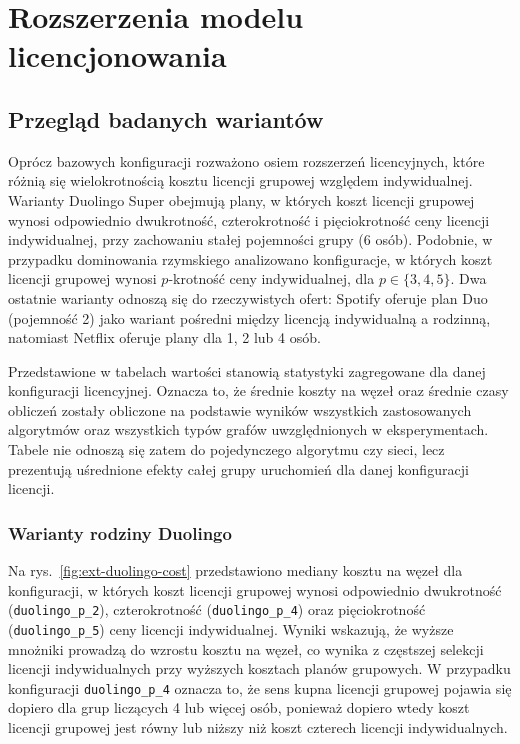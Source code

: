 \chapter{Rozszerzenia modelu licencjonowania}\label{chap:extensions}

\section{Przegląd badanych wariantów}
Oprócz bazowych konfiguracji rozważono osiem rozszerzeń licencyjnych, które różnią się wielokrotnością kosztu licencji grupowej względem indywidualnej. Warianty Duolingo Super obejmują plany, w których koszt licencji grupowej wynosi odpowiednio dwukrotność, czterokrotność i pięciokrotność ceny licencji indywidualnej, przy zachowaniu stałej pojemności grupy (6 osób). Podobnie, w przypadku dominowania rzymskiego analizowano konfiguracje, w których koszt licencji grupowej wynosi $p$-krotność ceny indywidualnej, dla $p \in \{3, 4, 5\}$. Dwa ostatnie warianty odnoszą się do rzeczywistych ofert: Spotify oferuje plan Duo (pojemność 2) jako wariant pośredni między licencją indywidualną a rodzinną, natomiast Netflix oferuje plany dla 1, 2 lub 4 osób.

Przedstawione w tabelach wartości stanowią statystyki zagregowane dla danej konfiguracji licencyjnej. Oznacza to, że średnie koszty na węzeł oraz średnie czasy obliczeń zostały obliczone na podstawie wyników wszystkich zastosowanych algorytmów oraz wszystkich typów grafów uwzględnionych w eksperymentach. Tabele nie odnoszą się zatem do pojedynczego algorytmu czy sieci, lecz prezentują uśrednione efekty całej grupy uruchomień dla danej konfiguracji licencji.


\subsection{Warianty rodziny Duolingo}
Na rys.~\ref{fig:ext-duolingo-cost} przedstawiono mediany kosztu na węzeł dla konfiguracji, w których koszt licencji grupowej wynosi odpowiednio dwukrotność (\texttt{duolingo\_p\_2}), czterokrotność (\texttt{duolingo\_p\_4}) oraz pięciokrotność (\texttt{duolingo\_p\_5}) ceny licencji indywidualnej. Wyniki wskazują, że wyższe mnożniki prowadzą do wzrostu kosztu na węzeł, co wynika z częstszej selekcji licencji indywidualnych przy wyższych kosztach planów grupowych. W przypadku konfiguracji \texttt{duolingo\_p\_4} oznacza to, że sens kupna licencji grupowej pojawia się dopiero dla grup liczących 4 lub więcej osób, ponieważ dopiero wtedy koszt licencji grupowej jest równy lub niższy niż koszt czterech licencji indywidualnych.

